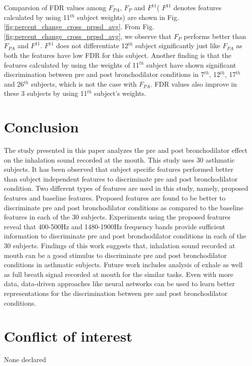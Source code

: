 \documentclass{article}
\begin{document}
Comparsion of FDR values among $F_{PA}$, $F_{P}$ and $F^{11}$( $F^{11}$ denotes features calculated by using 11$^{th}$ subject weights) are shown in Fig. \ref{fig:percent_change_cross_prpsd_avg}. From Fig. \ref{fig:percent_change_cross_prpsd_avg}, we observe that $F_{P}$ performs better than $F_{PA}$ and $F^{11}$. $F^{11}$ does not differentiate 12$^{th}$ subject significantly just like $F_{PA}$ as both the features have low FDR for this subject.
Another finding is that the features calculated by using the weights of 11$^{th}$ subject have shown significant discrimination between pre and post bronchodilator conditions in 7$^{th}$, 12$^{th}$, 17$^{th}$ and 26$^{th}$ subjects, which is not the case with $F_{PA}$. FDR values also improve in these 3 subjects by using 11$^{th}$ subject's weights.




\section{Conclusion}



The study presented in this paper analyzes the pre and post bronchodilator effect on the inhalation sound recorded at the mouth. This study uses 30 asthmatic subjects. It has been observed that subject specific features performed better than subject independent features to discriminate pre and post bronchodilator condition. Two different types of features are used in this study, namely, proposed features and baseline features. Proposed features are found to be better to discriminate pre and post bronchodilator conditions as compared to the baseline features in each of the 30 subjects. Experiments using the proposed features reveal that 400-500Hz and 1480-1900Hz frequency bands provide sufficient information to discriminate pre and post bronchodilator conditions in each of the 30 subjects. Findings of this work suggests that, inhalation sound recorded at mouth can be a good stimulus to discriminate pre and post bronchodilator conditions in asthmatic subjects. Future work includes analysis of exhale as well as full breath signal recorded at mouth for the similar tasks. Even with more data, data-driven approaches like neural networks can be used to learn better representations for the discrimination between pre and post bronchodilator conditions.

\section*{Conflict of interest}
None declared


	
\end{document}
